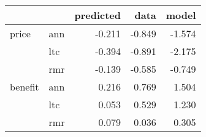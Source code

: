 \begin{tabular}{llrrr}
\toprule
        &     &  predicted &   data &  model \\
\midrule
price & ann &     -0.211 & -0.849 & -1.574 \\
        & ltc &     -0.394 & -0.891 & -2.175 \\
        & rmr &     -0.139 & -0.585 & -0.749 \\
benefit & ann &      0.216 &  0.769 &  1.504 \\
        & ltc &      0.053 &  0.529 &  1.230 \\
        & rmr &      0.079 &  0.036 &  0.305 \\
\bottomrule
\end{tabular}
